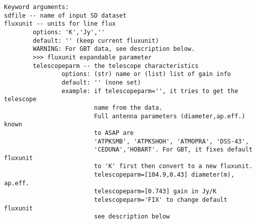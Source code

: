 \begin{verbatim}
Keyword arguments:
sdfile -- name of input SD dataset
fluxunit -- units for line flux
        options: 'K','Jy',''
        default: '' (keep current fluxunit)
        WARNING: For GBT data, see description below.
        >>> fluxunit expandable parameter
        telescopeparm -- the telescope characteristics
                options: (str) name or (list) list of gain info
                default: '' (none set)
                example: if telescopeparm='', it tries to get the telescope
                         name from the data.
                         Full antenna parameters (diameter,ap.eff.) known
                         to ASAP are
                         'ATPKSMB', 'ATPKSHOH', 'ATMOPRA', 'DSS-43',
                         'CEDUNA','HOBART'. For GBT, it fixes default fluxunit
                         to 'K' first then convert to a new fluxunit.
                         telescopeparm=[104.9,0.43] diameter(m), ap.eff.
                         telescopeparm=[0.743] gain in Jy/K
                         telescopeparm='FIX' to change default fluxunit
                         see description below


\end{verbatim}
